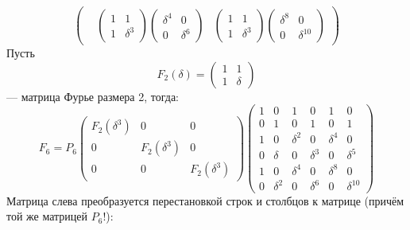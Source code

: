 \[\begin{pmatrix}
        &
        \begin{pmatrix}
            1 & 1        \\
            1 & \delta^3
        \end{pmatrix}
        \begin{pmatrix}
            \delta^4 & 0        \\
            0        & \delta^6
        \end{pmatrix}
        &
        \begin{pmatrix}
            1 & 1        \\
            1 & \delta^3
        \end{pmatrix}
        \begin{pmatrix}
            \delta^8 & 0           \\
            0        & \delta^{10}
        \end{pmatrix}
    \end{pmatrix}
\]
Пусть
\[
    F_2(\delta)
    = \begin{pmatrix}
          1 & 1      \\
          1 & \delta
    \end{pmatrix}
\]
--- матрица Фурье размера 2, тогда:
\[
    F_6
    = P_6
    \begin{pmatrix}
        F_2(\delta^3) & 0             & 0             \\
        0             & F_2(\delta^3) & 0             \\
        0             & 0             & F_2(\delta^3)
    \end{pmatrix}
    \begin{pmatrix}
        1 & 0        & 1        & 0        & 1        & 0           \\
        0 & 1        & 0        & 1        & 0        & 1           \\
        1 & 0        & \delta^2 & 0        & \delta^4 & 0           \\
        0 & \delta   & 0        & \delta^3 & 0        & \delta^5    \\
        1 & 0        & \delta^4 & 0        & \delta^8 & 0           \\
        0 & \delta^2 & 0        & \delta^6 & 0        & \delta^{10}
    \end{pmatrix}
\]
Матрица слева преобразуется перестановкой строк и столбцов к матрице (причём той же матрицей $P_6$!):
